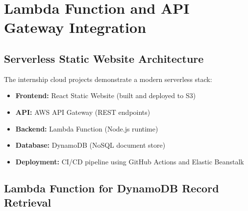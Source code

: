 
\section{Lambda Function and API Gateway Integration}

\subsection{Serverless Static Website Architecture}

The internship cloud projects demonstrate a modern serverless stack:

\begin{itemize}
    \item \textbf{Frontend:} React Static Website (built and deployed to S3)
    \item \textbf{API:} AWS API Gateway (REST endpoints)
    \item \textbf{Backend:} Lambda Function (Node.js runtime)
    \item \textbf{Database:} DynamoDB (NoSQL document store)
    \item \textbf{Deployment:} CI/CD pipeline using GitHub Actions and Elastic Beanstalk
\end{itemize}

\subsection{Lambda Function for DynamoDB Record Retrieval}

